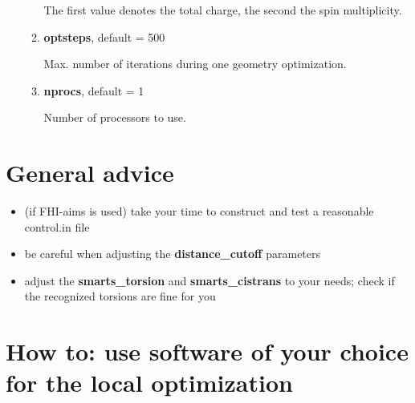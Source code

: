 \documentclass[a4paper]{article}
\begin{document}
\begin{itemize}
\begin{enumerate}
The first value denotes the total charge, the second the spin multiplicity.

	\item{\textbf{optsteps}}, default = 500

Max. number of iterations during one geometry optimization.

	\item{\textbf{nprocs}}, default = 1

Number of processors to use.
\end{enumerate}



\end{itemize}


\section{General advice}

\begin{itemize}
\item{(if FHI-aims is used) take your time to construct and test a reasonable control.in file}
\item{be careful when adjusting the \textbf{distance\_cutoff} parameters}
\item{adjust the \textbf{smarts\_torsion} and \textbf{smarts\_cistrans} to your needs; check if the recognized torsions are fine for you}
\end{itemize}

\section{How to: use software of your choice for the local optimization}
\end{document}
